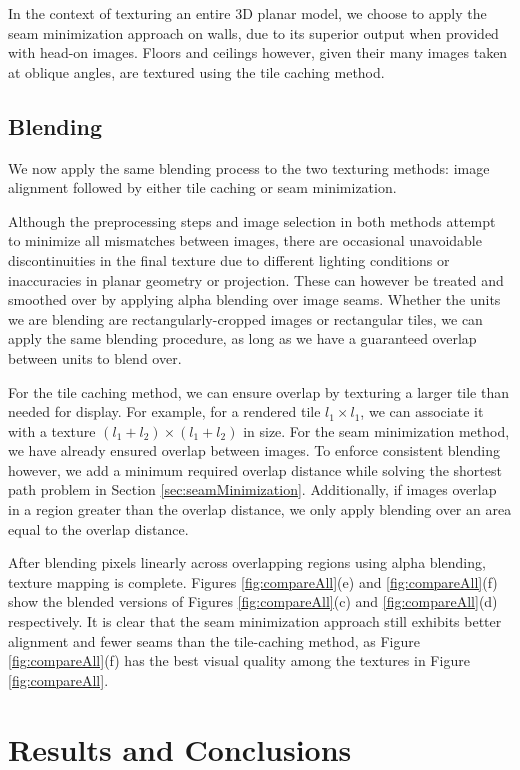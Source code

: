 \documentclass[]{spie}  %
\begin{document}
In the context of texturing an entire 3D planar model, we choose to
apply the seam minimization approach on walls, due to its superior
output when provided with head-on images. Floors and ceilings however,
given their many images taken at oblique angles, are textured using
the tile caching method.



\subsection{Blending}
\label{sec:blending}
We now apply the same blending process to the two texturing methods:
image alignment followed by either tile caching or seam minimization.

Although the preprocessing steps and image selection in both methods
attempt to minimize all mismatches between images, there are
occasional unavoidable discontinuities in the final texture due to
different lighting conditions or inaccuracies in planar geometry or
projection. These can however be treated and smoothed over by applying
alpha blending over image seams.  Whether the units we are blending
are rectangularly-cropped images or rectangular tiles, we can apply
the same blending procedure, as long as we have a guaranteed overlap
between units to blend over.

For the tile caching method, we can ensure overlap by texturing a
larger tile than needed for display. For example, for a rendered tile
$l_1 \times l_1$, we can associate it with a texture $(l_1 + l_2)
\times (l_1 + l_2)$ in size. For the seam minimization method, we have
already ensured overlap between images. To enforce consistent blending
however, we add a minimum required overlap distance while solving the
shortest path problem in Section
\ref{sec:seamMinimization}. Additionally, if images overlap in a
region greater than the overlap distance, we only apply blending over
an area equal to the overlap distance.

After blending pixels linearly across overlapping regions using alpha
blending, texture mapping is complete. Figures \ref{fig:compareAll}(e)
and \ref{fig:compareAll}(f) show the blended versions of Figures
\ref{fig:compareAll}(c) and \ref{fig:compareAll}(d) respectively. It
is clear that the seam minimization approach still exhibits better
alignment and fewer seams than the tile-caching method, as Figure
\ref{fig:compareAll}(f) has the best visual quality among the textures
in Figure \ref{fig:compareAll}.

\section{Results and Conclusions}
\label{sec:resultsAndConclusions}



\end{document}
